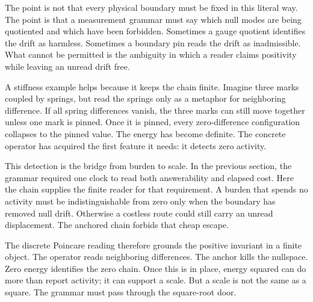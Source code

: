 The point is not that every physical boundary must be fixed in this literal
way. The point is that a measurement grammar must say which null modes are
being quotiented and which have been forbidden. Sometimes a gauge quotient
identifies the drift as harmless. Sometimes a boundary pin reads the drift
as inadmissible. What cannot be permitted is the ambiguity in which a reader
claims positivity while leaving an unread drift free.

A stiffness example helps because it keeps the chain finite. Imagine three
marks coupled by springs, but read the springs only as a metaphor for
neighboring difference. If all spring differences vanish, the three marks
can still move together unless one mark is pinned. Once it is pinned, every
zero-difference configuration collapses to the pinned value. The energy has
become definite. The concrete operator has acquired the first feature it
needs: it detects zero activity.

This detection is the bridge from burden to scale. In the previous section,
the grammar required one clock to read both answerability and elapsed cost.
Here the chain supplies the finite reader for that requirement. A burden
that spends no activity must be indistinguishable from zero only when the
boundary has removed null drift. Otherwise a costless route could still
carry an unread displacement. The anchored chain forbids that cheap escape.

The discrete Poincare reading therefore grounds the positive invariant in a
finite object. The operator reads neighboring differences. The anchor kills
the nullspace. Zero energy identifies the zero chain. Once this is in
place, energy squared can do more than report activity; it can support a
scale. But a scale is not the same as a square. The grammar must pass
through the square-root door.
